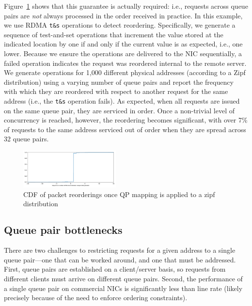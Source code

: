 Figure~\ref{fig:reorder} shows that this guarantee is actually required: i.e.,
requests across queue pairs are \emph{not} always processed in the order
received in practice.  In this example, we use RDMA \texttt{t\&s} operations to
detect reordering.  Specifically, we generate a sequence of test-and-set
operations that increment the value stored at the indicated location by one if
and only if the current value is as expected, i.e., one lower.  Because we
ensure the operations are delivered to the NIC sequentially, a failed operation
indicates the request was reordered internal to the remote server.  We generate
operations for 1,000 different physical addresses (according to a Zipf
distribution) using a varying number of queue pairs and report the frequency
with which they are reordered with respect to another request for the same
address (i.e., the \texttt{t\&s} operation fails).  As expected, when all
requests are issued on the same queue pair, they are serviced in order.  Once a
non-trivial level of concurrency is reached, however, the reordering becomes
significant, with over 7\% of requests to the same address serviced out of order
when they are spread across 32 queue pairs.

\begin{figure}[t]
    \includegraphics[width=0.45\textwidth]{fig/qp_reordering.pdf}
    \caption{CDF of packet reorderings once QP mapping is applied to a zipf distribution}
    \label{fig:reorder}
\end{figure}

\subsection{Queue pair bottlenecks}

 There are two challenges to restricting requests for a given address
 to a single queue pair---one that can be worked around, and one that
 must be addressed.  First, queue pairs are established on a
 client/server basis, so requests from different clients must arrive
 on different queue pairs.  Second, the performance of a single queue
 pair on commercial NICs is significantly less than line rate (likely
 precisely because of the need to enforce ordering constraints).

